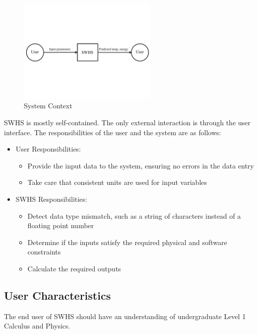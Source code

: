 \documentclass[12pt]{article}
\newcommand{\progname}{SWHS}
\begin{document}
\begin{figure}[h!]
\begin{center}
 \includegraphics[width=0.6\textwidth]{SystemContextFigure}
\caption{System Context}
\label{Fig_SystemContext} 
\end{center}
\end{figure}

\progname{} is mostly self-contained.  The only external interaction is through
the user interface.  The responsibilities of the user and the system are as
follows:

\begin{itemize}
\item User Responsibilities:
\begin{itemize}
\item Provide the input data to the system, ensuring no errors in the data entry
\item Take care that consistent units are used for input variables
\end{itemize}
\item \progname{} Responsibilities:
\begin{itemize}
\item Detect data type mismatch, such as a string of characters instead of a
  floating point number
\item Determine if the inputs satisfy the required physical and software constraints
\item Calculate the required outputs
\end{itemize}
\end{itemize}

\subsection{User Characteristics} \label{SecUserCharacteristics}

The end user of \progname{} should have an understanding of undergraduate Level
1 Calculus and Physics.
\end{document}
